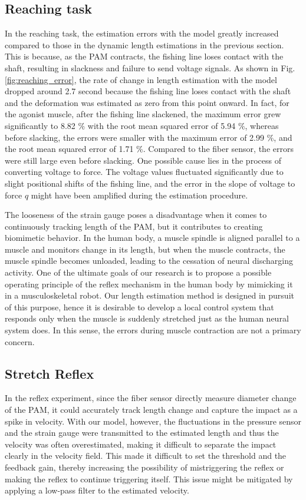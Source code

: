 \subsection{Reaching task}
In the reaching task, the estimation errors with the model greatly increased compared to those in the dynamic length estimations in the previous section. This is because, as the PAM contracts, the fishing line loses contact with the shaft, resulting in slackness and failure to send voltage signals. As shown in Fig.\ref{fig:reaching_error}, the rate of change in length estimation with the model dropped around 2.7 second because the fishing line loses contact with the shaft and the deformation was estimated as zero from this point onward. In fact, for the agonist muscle, after the fishing line slackened, the maximum error grew significantly to 8.82 $\%$ with the root mean squared error of 5.94 $\%$, whereas before slacking, the errors were smaller with the maximum error of 2.99 $\%$, and the root mean squared error of 1.71 $\%$. Compared to the fiber sensor, the errors were still large even before slacking. One possible cause lies in the process of converting voltage to force. The voltage values fluctuated significantly due to slight positional shifts of the fishing line, and the error in the slope of voltage to force $q$ might have been amplified during the estimation procedure.

The looseness of the strain gauge poses a disadvantage when it comes to continuously tracking length of the PAM, but it contributes to creating biomimetic behavior. In the human body, a muscle spindle is aligned parallel to a muscle and monitors change in its length, but when the muscle contracts, the muscle spindle becomes unloaded, leading to the cessation of neural discharging activity\cite{spindle}. One of the ultimate goals of our research is to propose a possible operating principle of the reflex mechanism in the human body by mimicking it in a musculoskeletal robot. Our length estimation method is designed in pursuit of this purpose, hence it is desirable to develop a local control system that responds only when the muscle is suddenly stretched just as the human neural system does. In this sense, the errors during muscle contraction are not a primary concern.

\subsection{Stretch Reflex}
In the reflex experiment, since the fiber sensor directly measure diameter change of the PAM, it could accurately track length change and capture the impact as a spike in velocity. With our model, however, the fluctuations in the pressure sensor and the strain gauge were transmitted to the estimated length and thus the velocity was often overestimated, making it difficult to separate the impact clearly in the velocity field. This made it difficult to set the threshold and the feedback gain, thereby increasing the possibility of mistriggering the reflex or making the reflex to continue triggering itself. This issue might be mitigated by applying a low-pass filter to the estimated velocity.

